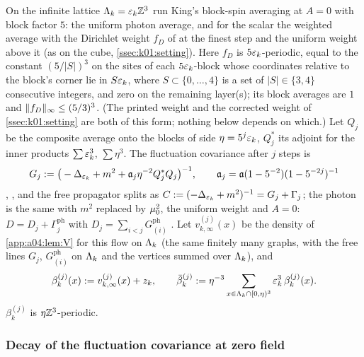 \begin{definition}\label{app:a04:def:bulk}
On the infinite lattice $\Lambda_k=\varepsilon_k\mathbb Z^3$ run King's block-spin averaging at $A=0$ with block factor $5$: the uniform photon average, and for the scalar the weighted average \cite[(3.1)--(3.2)]{K2} with the Dirichlet weight $f_D$ of \cite[(3.8)]{K2} at the finest step and the uniform weight above it (as on the cube, \cref{ssec:k01:setting}). Here $f_D$ is $5\varepsilon_k$-periodic, equal to the constant $(5/|S|)^3$ on the sites of each $5\varepsilon_k$-block whose coordinates relative to the block's corner lie in $S\varepsilon_k$, where $S\subset\{0,\dots,4\}$ is a set of $|S|\in\{3,4\}$ consecutive integers, and zero on the remaining layer(s); its block averages are $1$ and $\lVert f_D\rVert_\infty\le(5/3)^3$. (The printed weight and the corrected weight of \cref{ssec:k01:setting} are both of this form; nothing below depends on which.) Let $Q_j$ be the composite average onto the blocks of side $\eta=5^j\varepsilon_k$, $Q_j^*$ its adjoint for the inner products $\sum\varepsilon_k^3$, $\sum\eta^3$. The fluctuation covariance after $j$ steps is
\[
G_j:=\big(-\Delta_{\varepsilon_k}+m^2+\mathfrak a_j\eta^{-2}Q_j^*Q_j\big)^{-1},\qquad \mathfrak a_j=\mathfrak a(1-5^{-2})(1-5^{-2j})^{-1}
\]
\cite[(2.13)]{K1}, \cite[(3.5)]{K2}, and the free propagator splits as $C:=(-\Delta_{\varepsilon_k}+m^2)^{-1}=G_j+\Gamma_j$; the photon is the same with $m^2$ replaced by $\mu_0^2$, the uniform weight and $A=0$: $D=D_j+\Gamma^{\mathrm{ph}}_j$ with $D_j=\sum_{i<j}G^{\mathrm{ph}}_{(i)}$ \cite[(2.17)]{K1}. Let $v^{(j)}_{k,\infty}(x)$ be the density of \cref{app:a04:lem:V} for this flow on $\Lambda_k$ (the same finitely many graphs, with the free lines $G_j$, $G^{\mathrm{ph}}_{(i)}$ on $\Lambda_k$ and the vertices summed over $\Lambda_k$), and
\[
\beta^{(j)}_k(x):= v^{(j)}_{k,\infty}(x)+z_k,\qquad \bar\beta^{(j)}_k:=\eta^{-3}\sum_{x\in\Lambda_k\cap[0,\eta)^3}\varepsilon_k^3\,\beta^{(j)}_k(x).
\]
$\beta^{(j)}_k$ is $\eta\mathbb Z^3$-periodic.
\end{definition}

\subsubsection{Decay of the fluctuation covariance at zero field}

